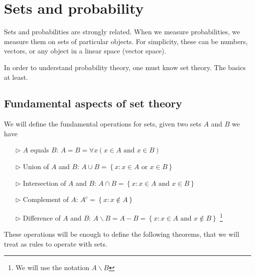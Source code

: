 \documentclass{report}
\newcounter{daggerfootnote}
\newcommand*{\daggerfootnote}[1]{%
    \setcounter{daggerfootnote}{\value{footnote}}%
    \renewcommand*{\thefootnote}{\fnsymbol{footnote}}%
    \footnote[2]{#1}%
    \setcounter{footnote}{\value{daggerfootnote}}%
    \renewcommand*{\thefootnote}{\arabic{footnote}}%
    }
\begin{document}
\section{Sets and probability}
Sets and probabilities are strongly related. When we measure probabilities, we measure them on sets of particular 
objects. For simplicity, these can be numbers, vectors, or any object in a linear space (vector space).

In order to understand probability theory, one must know set theory. The basics at least.
\subsection{Fundamental aspects of set theory}
We will define the fundamental operations for sets, given two sets $A$ and $B$ we have 
\begin{itemize}
    \item[$\triangleright$] $A$ equals $B$: $A = B = \forall x (x\in A \text{ and } x\in B)$
    \item[$\triangleright$] Union of $A$ and $B$: $A\cup B = \left\{x: x\in A \text{ or } x \in B\right\}$
    \item[$\triangleright$] Intersection of $A$ and $B$: $A\cap B = \left\{x: x\in A \text{ and } x \in B\right\}$
    \item[$\triangleright$] Complement of $A$: $A^{c} = \left\{x: x\notin A\right\}$
    \item[$\triangleright$] Difference of $A$ and $B$: $A\backslash B = A - B= \left\{x: x\in A \text{ and } x\notin B\right\}$\daggerfootnote{We will use the notation $A\backslash B$}
\end{itemize}
These operations will be enough to define the following theorems, that we will treat as 
rules to operate with sets.
\end{document}
